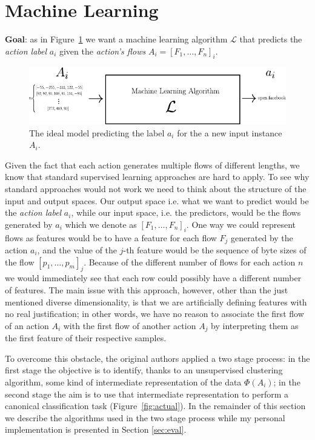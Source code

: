 \section{Machine Learning}
\label{sec:ml}

\textbf{Goal}: as in Figure~\ref{fig:ideal} we want a machine learning algorithm $\mathcal{L}$ that predicts the \textit{action label} $a_i$ given the \textit{action's flows} $A_i = [F_1,\dots, F_n]_i$.

\begin{figure}[h]
 \centering
 \includegraphics{images/ideal}
 \caption{\small{The ideal model predicting the label $a_i$ for the a new input instance $A_i$.}}
 \label{fig:ideal}
\end{figure}

Given the fact that each action generates multiple flows of different lengths, we know that standard supervised learning approaches are hard to apply. To see why standard approaches would not work we need to think about the structure of the input and output spaces. Our output space i.e. what we want to predict would be the \textit{action label} $a_i$, while our input space, i.e. the predictors, would be the flows generated by $a_i$ which we denote as $[F_1,\dots,F_n]_i $. One way we could represent flows as features would be to have a feature for each flow $F_j$ generated by the action $a_i$, and the value of the $j$-th feature would be the sequence of byte sizes of the flow $[p_1,\dots, p_m]_j$. Because of the different number of flows for each action  $n$ we would immediately see that each row could possibly have a different number of features. The main issue with this approach, however, other than the just mentioned diverse dimensionality, is that we are artificially defining features with no real justification; in other words, we have no reason to associate the first flow of an action $A_i$ with the first flow of another action $A_j$ by interpreting them as the first feature of their respective samples.


To overcome this obstacle, the original authors applied a two stage process: in the first stage the objective is to identify, thanks to an unsupervised clustering algorithm, some kind of intermediate representation of the data $\Phi(A_i)$; in the second stage the aim is to use that intermediate representation to perform a canonical classification task (Figure~\ref{fig:actual}). 
In the remainder of this section we describe the algorithms used in the two stage process while my personal implementation is presented in Section \ref{sec:eval}.

